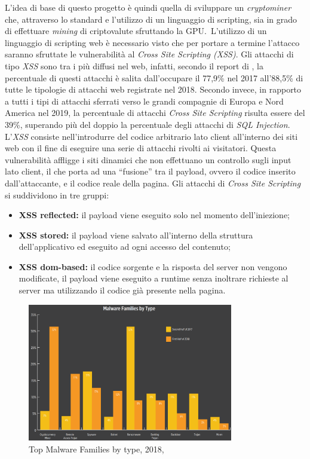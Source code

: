 \documentclass[
11pt, %
oneside, %
italian, %
onehalfspacing,%
headsepline, %
]{MastersDoctoralThesis} %
\newcommand\citen[1]{\citeauthor{#1} \citep{#1}}
\newcommand\citetitlen[1]{\citetitle{#1} \citep{#1}}
\begin{document}
L'idea di base di questo progetto è quindi quella di sviluppare un \emph{cryptominer} che, attraverso lo standard \citetitlen{OpenGL} e l'utilizzo di un linguaggio di scripting, sia in grado di effettuare \emph{mining} di criptovalute sfruttando la GPU.\ L'utilizzo di un linguaggio di scripting web è necessario visto che per portare a termine l'attacco saranno sfruttate le vulnerabilità al \emph{Cross Site Scripting (XSS)}. Gli attacchi di tipo \emph{XSS} sono tra i più diffusi nel web, infatti, secondo il report di \citen{PositiveTechnologiesReport}, la percentuale di questi attacchi è salita dall'occupare il 77,9\% nel 2017 all'88,5\% di tutte le tipologie di attacchi web registrate nel 2018. Secondo \citen{PreciseSecurityReport} invece, in rapporto a tutti i tipi di attacchi sferrati verso le grandi compagnie di Europa e Nord America nel 2019, la percentuale di attacchi \emph{Cross Site Scripting} risulta essere del 39\%, superando più del doppio la percentuale degli attacchi di \emph{SQL Injection}.\\
L'\emph{XSS} consiste nell’introdurre del codice arbitrario lato client all'interno dei siti web con il fine di eseguire una serie di attacchi rivolti ai visitatori. Questa vulnerabilità affligge i siti dinamici che non effettuano un controllo sugli input lato client, il che porta ad una ``fusione'' tra il payload, ovvero il codice inserito dall'attaccante, e il codice reale della pagina. Gli attacchi di \emph{Cross Site Scripting} si suddividono in tre gruppi:
\begin{itemize}
  \item\textbf{XSS reflected:} il payload viene eseguito solo nel momento dell’iniezione;
  \item\textbf{XSS stored:} il payload viene salvato all'interno della struttura dell'applicativo ed eseguito ad ogni accesso del contenuto;
  \item\textbf{XSS dom-based:} il codice sorgente e la risposta del server non vengono modificate, il payload viene eseguito a runtime senza inoltrare richieste al server ma utilizzando il codice già presente nella pagina.
\end{itemize}

\begin{figure}[hbt!]
\caption{Top Malware Families by type, 2018, \citetitlen{skyboxtrends}}\label{fig:topmalwarefamilies}
\centering
\includegraphics[width=0.8\textwidth]{TopMalwareFamilies.png}
\end{figure}
\end{document}
